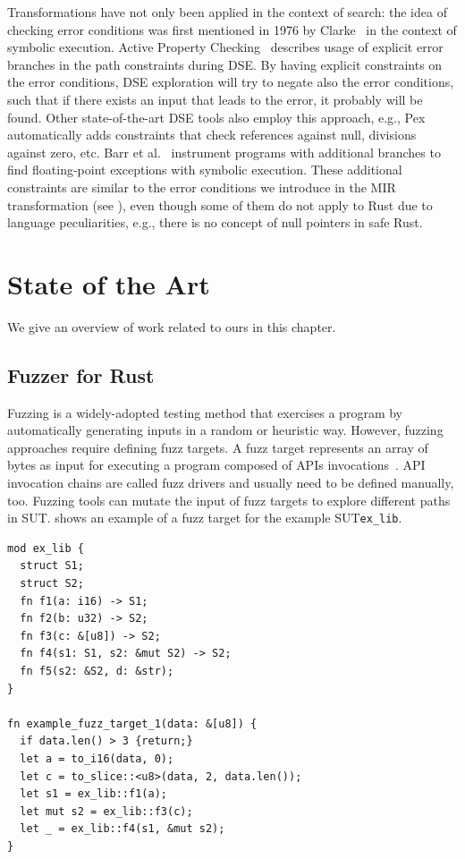 \documentclass[paper=a4,%
  twoside,%
  BCOR4mm,%
  abstract=true,%
  toc=bibliography,%
  chapterprefix=true,%
  toc=bibliographynumbered,%
  open=right,%
  english,%
  pagesize=pdftex]{scrreprt}
\newcommand{\mir}{\ac{MIR}\xspace}
\newcommand{\sut}{\ac{SUT}\xspace}
\begin{document}

Transformations have not only been applied in the context of search: the idea of checking error conditions was first mentioned in 1976 by Clarke~\cite{Clarke1976} in the context of symbolic execution. Active Property Checking~\cite{Godefroid_2005} describes usage of explicit error branches in the path constraints during \ac{DSE}. By having explicit constraints on the error conditions, \ac{DSE} exploration will try to negate also the error conditions, such that if there exists an input that leads to the error, it probably will be found. Other state-of-the-art \ac{DSE} tools also employ this approach, e.g., Pex~\cite{Tillmann2008} automatically adds constraints that check references against null, divisions against zero, etc. Barr et al.~\cite{Barr2013} instrument programs with additional branches to find floating-point exceptions with symbolic execution. These additional constraints are similar to the error conditions we introduce in the \mir transformation (see ), even though some of them do not apply to Rust due to language peculiarities, e.g., there is no concept of null pointers in safe Rust.

\clearpage
\chapter{State of the Art}
\label{chap:state-of-the-art}
We give an overview of work related to ours in this chapter. 

\section{Fuzzer for Rust}
Fuzzing is a widely-adopted testing method that exercises a program by automatically generating inputs in a random or heuristic way. However, fuzzing approaches require defining fuzz targets. A fuzz target represents an array of bytes as input for executing a program composed of \acp{API} invocations~\cite{Jiang2021}. \ac{API} invocation chains are called fuzz drivers and usually need to be defined manually, too. Fuzzing tools can mutate the input of fuzz targets to explore different paths in \sut.  shows an example of a fuzz target for the example \sut \texttt{ex\_lib}.

\begin{lstlisting}[style=boxed, caption={A sample problem for fuzz target generation~\cite{Jiang2021}}, label=lst:fuzz-target-example]
mod ex_lib {
  struct S1;
  struct S2;
  fn f1(a: i16) -> S1;
  fn f2(b: u32) -> S2;
  fn f3(c: &[u8]) -> S2;
  fn f4(s1: S1, s2: &mut S2) -> S2;
  fn f5(s2: &S2, d: &str);
}

fn example_fuzz_target_1(data: &[u8]) {
  if data.len() > 3 {return;}
  let a = to_i16(data, 0);
  let c = to_slice::<u8>(data, 2, data.len());
  let s1 = ex_lib::f1(a);
  let mut s2 = ex_lib::f3(c);
  let _ = ex_lib::f4(s1, &mut s2);
}
\end{lstlisting}
\end{document}
